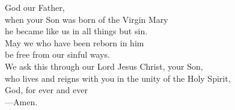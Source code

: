 \prayer

\begin{prayerverse}
God our Father,\\
when your Son was born of the Virgin Mary\\
he became like us in all things but sin.\\
May we who have been reborn in him\\
be free from our sinful ways.\\
We ask this through our Lord Jesus Christ, your Son,\\
who lives and reigns with you in the unity of the Holy Spirit,\\
God, for ever and ever\\
{\color{red}---\thinspace}Amen.

\end{prayerverse}

